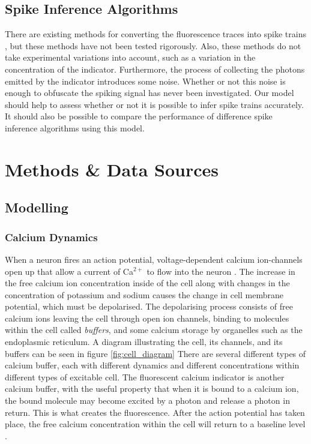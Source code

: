 \documentclass[a4paper,12pt]{article}
\theoremstyle{definition}
\begin{document}
\subsection{Spike Inference Algorithms}
There are existing methods for converting the fluorescence traces into spike trains \cite{vogelstein, pnevmatikakis, jewell, friedrich}, but these methods have not been tested rigorously. Also, these methods do not take experimental variations into account, such as a variation in the concentration of the indicator. Furthermore, the process of collecting the photons emitted by the indicator introduces some noise. Whether or not this noise is enough to obfuscate the spiking signal has never been investigated. Our model should help to assess whether or not it is possible to infer spike trains accurately. It should also be possible to compare the performance of difference spike inference algorithms using this model.

\section{Methods \& Data Sources} %

\subsection{Modelling}\label{sec:model}

\subsubsection{Calcium Dynamics}\label{sec:calcium_dynamics}
When a neuron fires an action potential, voltage-dependent calcium ion-channels open up that allow a current of Ca$^{2+}$ to flow into the neuron \cite{koch}. The increase in the free calcium ion concentration inside of the cell along with changes in the concentration of potassium and sodium causes the change in cell membrane potential, which must be depolarised. The depolarising process consists of free calcium ions leaving the cell through open ion channels, binding to molecules within the cell called \textit{buffers}, and some calcium storage by organelles such as the endoplasmic reticulum. A diagram illustrating the cell, its channels, and its buffers can be seen in figure \ref{fig:cell_diagram} There are several different types of calcium buffer, each with different dynamics and different concentrations within different types of excitable cell. The fluorescent calcium indicator is another calcium buffer, with the useful property that when it is bound to a calcium ion, the bound molecule may become excited by a photon and release a photon in return. This is what creates the fluorescence. After the action potential has taken place, the free calcium concentration within the cell will return to a baseline level \cite{maravall}.
\end{document}
